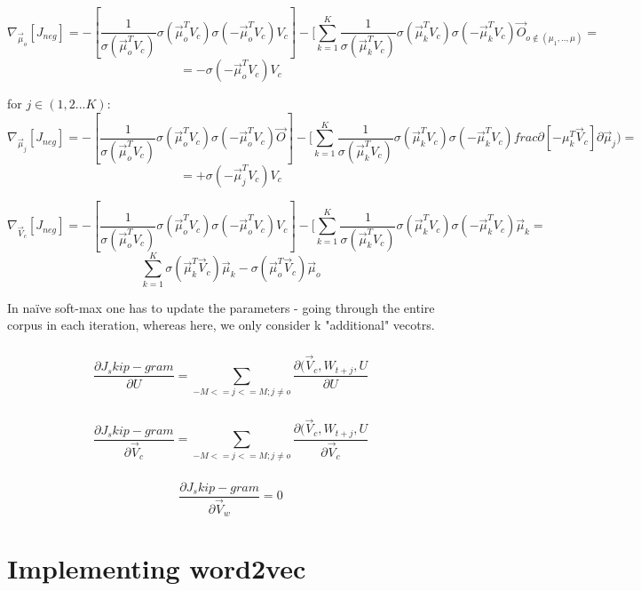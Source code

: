 \documentclass{article}
\begin{document}
\subsection{}

\[
\nabla_{\vec\mu_o}[J_{neg}] = 
-[\frac{1}{\sigma(\vec\mu_o^T V_c)} \sigma(\vec\mu_o^T V_c) \sigma(-\vec\mu_o^T V_c) V_c] - [\sum_{k=1}^{K} \frac{1}{\sigma(\vec\mu_k^T V_c)} \sigma(\vec\mu_k^T V_c) \sigma(-\vec\mu_k^T V_c) \vec O_{o \notin (\mu_1,..,\mu)}  = 
\]
\[
 = -\sigma(-\vec\mu_o^T V_c) V_c
\]

for $j\in(1,2...K)$:
\[
\nabla_{\vec\mu_j}[J_{neg}] = 
-[\frac{1}{\sigma(\vec\mu_o^T V_c)} \sigma(\vec\mu_o^T V_c) \sigma(-\vec\mu_o^T V_c) \vec O] - [\sum_{k=1}^{K} \frac{1}{\sigma(\vec\mu_k^T V_c)} \sigma(\vec\mu_k^T V_c) \sigma(-\vec\mu_k^T V_c) frac{\partial [-\mu_k^T\vec V_c]}{\partial \vec\mu_j})  = 
\]
\[
 = +\sigma(-\vec\mu_j^T V_c) V_c
\]

\[
\nabla_{\vec V_c}[J_{neg}] = 
-[\frac{1}{\sigma(\vec\mu_o^T V_c)} \sigma(\vec\mu_o^T V_c) \sigma(-\vec\mu_o^T V_c) V_c] - [\sum_{k=1}^{K} \frac{1}{\sigma(\vec\mu_k^T V_c)} \sigma(\vec\mu_k^T V_c) \sigma(-\vec\mu_k^T V_c) \vec\mu_k  =
\]
\[
\sum_{k=1}^{K} \sigma(\vec\mu_k^T\vec V_c) \vec\mu_k - \sigma(\vec\mu_o^T\vec V_c) \vec\mu_o 
\]

In naïve soft-max one has to update the parameters - going through the entire corpus in each iteration, whereas here, we only consider k "additional" vecotrs.

\subsubsection{}
\[
\frac {\partial J_skip-gram}{\partial U} = \sum_{-M <= j <= M ; j \neq o } \frac {\partial (\vec V_c, W_{t+j}, U} {\partial U}
\]
\subsubsection{}
\[
\frac {\partial J_skip-gram}{\partial \vec V_c} = \sum_{-M <= j <= M ; j \neq o } \frac {\partial (\vec V_c, W_{t+j}, U} {\partial \vec V_c}
\]
\subsubsection{}
\[
\frac {\partial J_skip-gram}{\partial \vec V_w} = 0
\]

\newpage

\section{Implementing word2vec}
\setcounter{subsection}{4}
\end{document}
